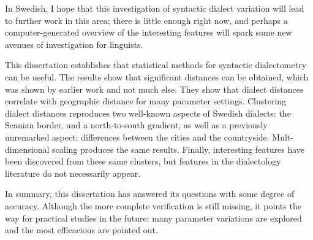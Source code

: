 In Swedish, I hope that this investigation of syntactic dialect
variation will lead to further work in this area; there is little
enough right now, and perhaps a computer-generated overview of the
interesting features will spark some new avenues of investigation for
linguists.


This dissertation establishes that statistical methods for syntactic
dialectometry can be useful. The results show that significant
distances can be obtained, which was shown by earlier work and not
much else. They show that dialect distances correlate with geographic
distance for many parameter settings. Clustering dialect distances
reproduces two well-known aspects of Swedish dialects: the Scanian
border, and a north-to-south gradient, as well as a previously unremarked
aspect: differences between the cities and the
countryside. Mult-dimensional scaling produces the same
results. Finally, interesting features have been discovered from these
same clusters, but features in the dialectology literature do not
necessarily appear.

In summary, this dissertation has answered its questions with some
degree of accuracy. Although the more complete verification is still
missing, it points the way for practical studies in the future: many
parameter variations are explored and the most efficacious are pointed
out.

